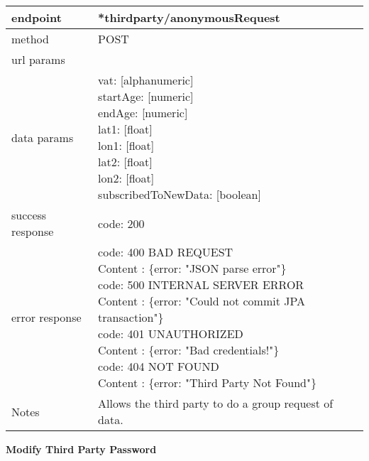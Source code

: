 \begin{tabularx}{\linewidth}{| l| l }
	\hline
	endpoint & *thirdparty/anonymousRequest \\
	\hline
	method & POST \\
	\hline
	url params & \\
	\hline
	data params &
	\parbox{0.7\textwidth}{
		\bigskip
		vat: [alphanumeric]\\
		startAge: [numeric]\\
		endAge: [numeric]\\
		lat1: [float]\\
		lon1: [float]\\
		lat2: [float]\\
		lon2: [float]\\
		subscribedToNewData: [boolean]
		\bigskip
	} \\
	\hline
	success response &
	\parbox{0.7\textwidth}{
		\bigskip
		code: 200
		\bigskip
	} \\
	\hline
	error response &
	\parbox{0.7\textwidth}{
		\bigskip
		code: 400 BAD REQUEST \\
		Content : \{error: "JSON parse error"\}\\
		code: 500 INTERNAL SERVER ERROR \\
		Content : \{error: "Could not commit JPA transaction"\}\\
		code: 401 UNAUTHORIZED \\
		Content : \{error: "Bad credentials!"\}\\
		code: 404 NOT FOUND \\
		Content : \{error: "Third Party Not Found"\}\\
		\bigskip
	} \\
	\hline
	Notes & 
	\parbox{0.7\textwidth}{
		\bigskip Allows the third party to do a group request of data.
	\bigskip}  \\
	\hline
\end{tabularx}

\textbf{Modify Third Party Password}\\

